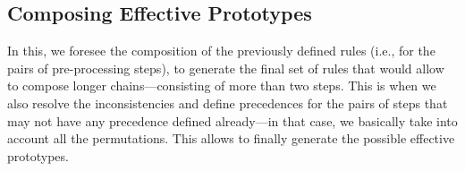 \begin{example}
\end{example}

\subsection{Composing Effective Prototypes}
\label{effective-ssec:composition}
In this, we foresee the composition of the previously defined rules (i.e., for the pairs of pre-processing steps), to generate the final set of rules that would allow to compose longer chains---consisting of more than two steps.
This is when we also resolve the inconsistencies and define precedences for the pairs of steps that may not have any precedence defined already---in that case, we basically take into account all the permutations.
This allows to finally generate the possible effective  prototypes.

